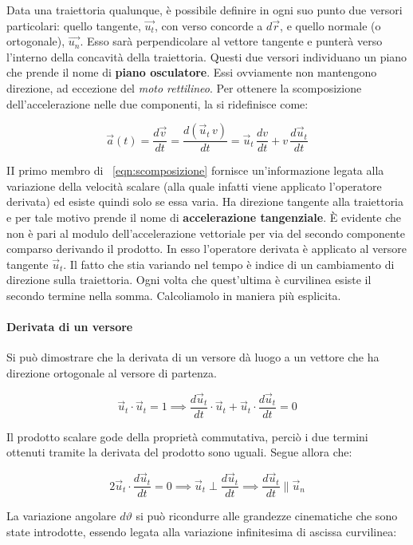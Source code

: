 Data una traiettoria qualunque, è possibile definire in ogni suo punto due versori particolari: quello tangente, $\vec{u_t}$, con verso concorde a $d\vec{r}$, e quello normale (o ortogonale), $\vec{u_n}$. Esso sarà perpendicolare al vettore tangente e punterà verso l'interno della concavità della traiettoria. Questi due versori individuano un piano che prende il nome di \textbf{piano osculatore}. Essi ovviamente non mantengono direzione, ad eccezione del \emph{moto rettilineo}.
Per ottenere la scomposizione dell'accelerazione nelle due componenti, la si ridefinisce come:

\begin{equation}
	\label{eqn:scomposizione}
	\boxed{\vec{a}(t)=\frac{d\vec{v}}{dt}=\frac{d(\vec{u}_t\,v)}{dt}=\vec{u}_t\,\frac{dv}{dt}+v\,\frac{d\vec{u}_t}{dt}}
\end{equation}

II primo membro di ~\eqref{eqn:scomposizione} fornisce un'informazione legata alla variazione della velocità scalare (alla quale infatti viene applicato l'operatore derivata) ed esiste quindi solo se essa varia. Ha direzione tangente alla traiettoria e per tale motivo prende il nome di \textbf{accelerazione tangenziale}. È evidente che non è pari al modulo dell'accelerazione vettoriale per via del secondo componente comparso derivando il prodotto. In esso l'operatore derivata è applicato al versore tangente $\vec{u}_t$. Il fatto che stia variando nel tempo è indice di un cambiamento di direzione sulla traiettoria. Ogni volta che quest'ultima è curvilinea esiste il secondo termine nella somma. Calcoliamolo in maniera più esplicita.

\paragraph{Derivata di un versore} Si può dimostrare che la derivata di un versore dà luogo a un vettore che ha direzione ortogonale al versore di partenza.

\[
	\vec{u}_t\cdot\vec{u}_t=1 \implies \frac{d\vec{u}_t}{dt}\cdot \vec{u}_t+ \vec{u}_t\cdot \frac{d\vec{u}_t}{dt}=0
\]

Il prodotto scalare gode della proprietà commutativa, perciò i due termini ottenuti tramite la derivata del prodotto sono uguali. Segue allora che:

\[
	2\vec{u}_t\cdot\frac{d\vec{u}_t}{dt}=0 \implies \vec{u}_t\perp \frac{d\vec{u}_t}{dt} \implies \frac{d\vec{u}_t}{dt} \parallel \vec{u}_n
\]

La variazione angolare $d\vartheta$ si può ricondurre alle grandezze cinematiche che sono state introdotte, essendo legata alla variazione infinitesima di ascissa curvilinea:

